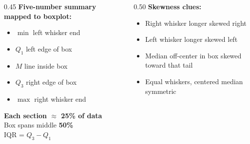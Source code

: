 \documentclass[aspectratio=169, 11pt]{beamer}
\begin{document}
{
\begin{frame}[t, plain]
  \vspace{0.45cm}\par
  \hspace{0.55cm}%
  \begin{minipage}{0.9\textwidth}

    \small
    \begin{columns}[T]
    \begin{column}{0.45\textwidth}
      \textbf{Five-number summary mapped to boxplot:}
      \begin{itemize}\setlength{\itemsep}{0.3em}
        \item $\min$ \textrightarrow{} left whisker end
        \item $Q_1$ \textrightarrow{} left edge of box
        \item $M$ \textrightarrow{} line inside box
        \item $Q_3$ \textrightarrow{} right edge of box
        \item $\max$ \textrightarrow{} right whisker end
      \end{itemize}

      \vspace{0.5em}
      \textbf{Each section $\approx$ 25\% of data}\\
      Box spans middle \textbf{50\%}\\
      IQR = $Q_3 - Q_1$
    \end{column}
    \begin{column}{0.50\textwidth}
      \textbf{Skewness clues:}
      \begin{itemize}\setlength{\itemsep}{0.3em}
        \item Right whisker longer \textrightarrow{} skewed right
        \item Left whisker longer \textrightarrow{} skewed left
        \item Median off-center in box \textrightarrow{} skewed toward that tail
        \item Equal whiskers, centered median \textrightarrow{} symmetric
      \end{itemize}
    \end{column}
    \end{columns}
  \end{minipage}
\end{frame}
}
\end{document}
